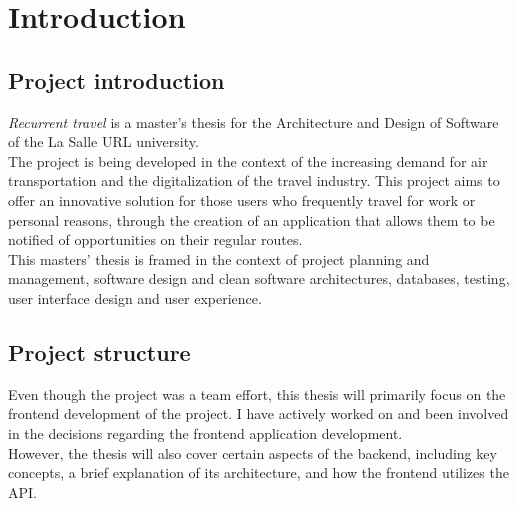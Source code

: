 \documentclass[../memory.tex]{subfiles}
\begin{document}
\chapter{Introduction}
\section{Project introduction}
\emph{Recurrent travel} is a master's thesis for the Architecture and Design of
Software of the La Salle URL university.
\\
The project is being developed in the context of the increasing demand for air
transportation and the digitalization of the travel industry. This project aims
to offer an innovative solution for those users who frequently travel for work
or personal reasons, through the creation of an application that allows them to
be notified of opportunities on their regular routes.
\\[8pt]
This masters' thesis is framed in the context of project planning and management,
software design and clean software architectures, databases, testing, user
interface design and user experience.
\section{Project structure}
Even though the project was a team effort, this thesis will primarily focus on
the frontend development of the project. I have actively worked on and been
involved in the decisions regarding the frontend application development.
\\[8pt]
However, the thesis will also cover certain aspects of the backend, including
key concepts, a brief explanation of its architecture, and how the frontend
utilizes the API.
\end{document}

